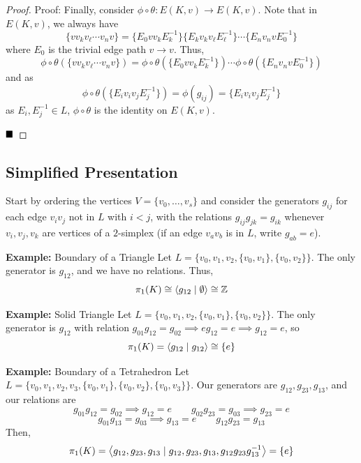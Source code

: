 \begin{proof}{Proof:}
    Finally, consider $\phi \circ \theta : E(K, v) \to E(K, v)$. Note that in $E(K, v)$, we always have
    \[ \{v v_k v_{\ell} \cdots v_n v\} = \{E_0 v v_k E_k^{-1}\}\{E_k v_k v_{\ell} E_{\ell}^{-1}\} \cdots \{E_n v_n v E_0^{-1}\} \]
    where $E_0$ is the trivial edge path $v \to v$. Thus,
    \[ \phi \circ \theta(\{v v_k v_{\ell} \cdots v_n v\}) = \phi \circ \theta(\{E_0 v v_k E_k^{-1}\}) \cdots \phi \circ \theta(\{E_n v_n v E_0^{-1}\}) \]
    and as
    \[ \phi \circ \theta(\{E_i v_i v_j E_j^{-1}\}) = \phi(g_{ij}) = \{E_i v_i v_j E_j^{-1}\} \]
    as $E_i, E_j^{-1} \in L$, $\phi \circ \theta$ is the identity on $E(K, v)$.

    $\qed$
\end{proof}

\subsection*{Simplified Presentation}
\sectionspace


Start by ordering the vertices $V = \{v_0, \ldots, v_s\}$ and consider the generators $g_{ij}$ for each edge $v_i v_j$ not in $L$ with $i < j$, with the relations $g_{ij}g_{jk} = g_{ik}$ whenever $v_i, v_j, v_k$ are vertices of a $2$-simplex (if an edge $v_a v_b$ is in $L$, write $g_{ab} = e$).

\begin{example}{\textbf{Example:} Boundary of a Triangle}
    Let $L = \{v_0, v_1, v_2, \{v_0, v_1\}, \{v_0, v_2\}\}$. The only generator is $g_{12}$, and we have no relations. Thus,
    \[ \pi_1(K) \cong \left\langle {g_{12} \mid \emptyset} \right\rangle \cong \mathbb{Z} \]
\end{example}

\begin{example}{\textbf{Example:} Solid Triangle}
    Let $L = \{v_0, v_1, v_2, \{v_0, v_1\}, \{v_0, v_2\}\}$. The only generator is $g_{12}$ with relation $g_{01}g_{12} = g_{02} \implies eg_{12} = e \implies g_{12} = e$, so
    \[ \pi_1(K) = \left\langle {g_{12} \mid g_{12}} \right\rangle \cong \{e\} \]
\end{example}

\begin{example}{\textbf{Example:} Boundary of a Tetrahedron}
    Let $L = \{v_0, v_1, v_2, v_3, \{v_0, v_1\}, \{v_0, v_2\}, \{v_0, v_3\}\}$. Our generators are $g_{12}, g_{23}, g_{13}$, and our relations are 
    \[ g_{01}g_{12} = g_{02} \implies g_{12} = e \qquad g_{02}g_{23} = g_{03} \implies g_{23} = e \]
    \[ g_{01}g_{13} = g_{03} \implies g_{13} = e \qquad g_{12}g_{23} = g_{13} \]
    Then,
    \[ \pi_1(K) = \left\langle {g_{12}, g_{23}, g_{13} \mid g_{12}, g_{23}, g_{13}, g_{12}g_{23}g_{13}^{-1}} \right\rangle = \{e\} \]
\end{example}

